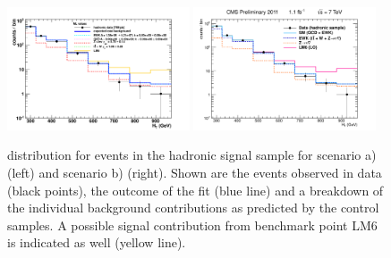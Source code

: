  \begin{figure}[h]
   \begin{center}
     \includegraphics[width = 0.48\textwidth]{Figures/Analysis/PAS/stats_plots/RQcdZero/hadronic_signal_fit_logy.pdf}
     \includegraphics[width = 0.48\textwidth]{Figures/Analysis/PAS/stats_plots/RQcdFallingExp/hadronic_signal_fit_logy.pdf}
     \caption{\label{fig:hadronic} \scalht distribution for events in the hadronic signal sample for scenario a) (left) and scenario b) (right). Shown are the events observed in data (black points), the outcome of the fit (blue line) and a breakdown of the individual background contributions as predicted by the control samples. A possible signal contribution from benchmark point LM6 is indicated as well (yellow line).}
   \end{center}
 \end{figure}

